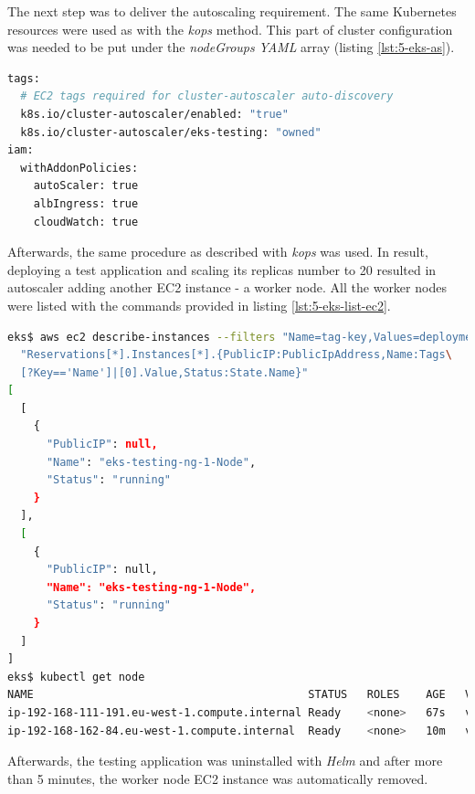 The next step was to deliver the autoscaling requirement. The same Kubernetes resources were used as with the \textit{kops} method. This part of cluster configuration was needed to be put under the \textit{nodeGroups} \textit{YAML} array (listing \ref{lst:5-eks-as}).
\begin{lstlisting}[basicstyle=\scriptsize,xleftmargin=0cm,label=lst:5-eks-as,caption={\textit{Eksctl} configuration needed for autoscaler},captionpos=b,language=Bash ]
tags:
  # EC2 tags required for cluster-autoscaler auto-discovery
  k8s.io/cluster-autoscaler/enabled: "true"
  k8s.io/cluster-autoscaler/eks-testing: "owned"
iam:
  withAddonPolicies:
    autoScaler: true
    albIngress: true
    cloudWatch: true
\end{lstlisting}

Afterwards, the same procedure as described with \textit{kops} was used. In result, deploying a test application and scaling its replicas number to 20 resulted in autoscaler adding another EC2 instance - a worker node. All the worker nodes were listed with the  commands provided in listing \ref{lst:5-eks-list-ec2}.
\begin{lstlisting}[basicstyle=\scriptsize,xleftmargin=0cm,label=lst:5-eks-list-ec2,caption={Listing \textit{EC2 instances}, one was created by autoscaler},captionpos=b,language=Bash]
eks$ aws ec2 describe-instances --filters "Name=tag-key,Values=deployment" --query\
  "Reservations[*].Instances[*].{PublicIP:PublicIpAddress,Name:Tags\
  [?Key=='Name']|[0].Value,Status:State.Name}"
[
  [
    {
      "PublicIP": null,
      "Name": "eks-testing-ng-1-Node",
      "Status": "running"
    }
  ],
  [
    {
      "PublicIP": null,
      "Name": "eks-testing-ng-1-Node",
      "Status": "running"
    }
  ]
]
eks$ kubectl get node
NAME                                          STATUS   ROLES    AGE   VERSION
ip-192-168-111-191.eu-west-1.compute.internal Ready    <none>   67s   v1.16.8-eks-e16311
ip-192-168-162-84.eu-west-1.compute.internal  Ready    <none>   10m   v1.16.8-eks-e16311
\end{lstlisting}
Afterwards, the testing application was uninstalled with \textit{Helm} and after more than 5 minutes, the worker node EC2 instance was automatically removed.

